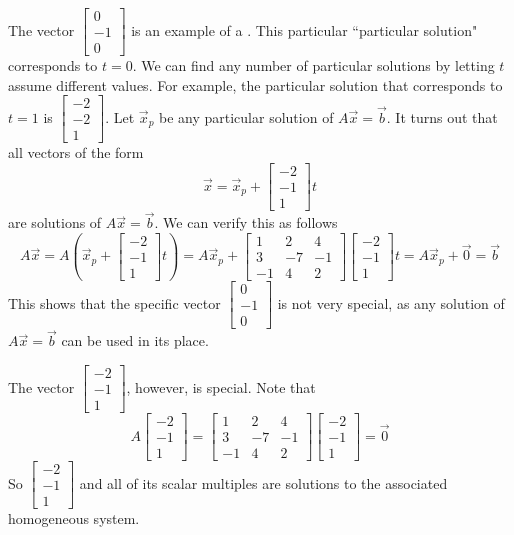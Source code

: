 \documentclass{ximera}
\begin{document}
\begin{exploration}
 The vector $\begin{bmatrix}0\\-1\\0\end{bmatrix}$ is an example of a .  This particular ``particular solution" corresponds to $t=0$.  We can find any number of particular solutions by letting $t$ assume different values.  For example, the particular solution that corresponds to $t=1$ is $\begin{bmatrix}-2\\-2\\1\end{bmatrix}$.  Let $\vec{x}_p$ be any particular solution of $A\vec{x}=\vec{b}$.  It turns out that all vectors of the form $$\vec{x}=\vec{x}_p+\begin{bmatrix}-2\\-1\\1\end{bmatrix}t$$ are solutions of $A\vec{x}=\vec{b}$.  We can verify this as follows
 $$A\vec{x}=A\left(\vec{x}_p+\begin{bmatrix}-2\\-1\\1\end{bmatrix}t\right)=A\vec{x}_p+\begin{bmatrix}1&2&4\\3&-7&-1\\-1&4&2\end{bmatrix}\begin{bmatrix}-2\\-1\\1\end{bmatrix}t=A\vec{x}_p+\vec{0}=\vec{b}$$
 This shows that the specific vector $\begin{bmatrix}0\\-1\\0\end{bmatrix}$ is not very special, as any solution of $A\vec{x}=\vec{b}$ can be used in its place.  
 
 The vector $\begin{bmatrix}-2\\-1\\1\end{bmatrix}$, however, is special.  
 Note that
 $$A\begin{bmatrix}-2\\-1\\1\end{bmatrix}=\begin{bmatrix}1&2&4\\3&-7&-1\\-1&4&2\end{bmatrix}\begin{bmatrix}-2\\-1\\1\end{bmatrix}=\vec{0}$$
 So $\begin{bmatrix}-2\\-1\\1\end{bmatrix}$ and all of its scalar multiples are solutions to the associated homogeneous system.  
\end{exploration}
\end{document}
